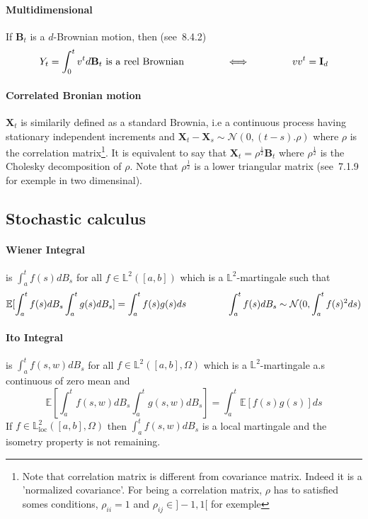 \documentclass[a4paper,10pt]{article}
\begin{document}
\paragraph{Multidimensional}
If $\textbf{B}_t$ is a $d$-Brownian motion, then (see~\cite{OKSENDAL}8.4.2)
\[
Y_t = \int_0^t v^t d\textbf{B}_t \text{ is a reel Brownian} 
\hspace{1.5cm} \Longleftrightarrow \hspace{1.5cm}
vv^t = \textbf{I}_d
\]
\paragraph{Correlated Bronian motion } $\textbf{X}_t$ is similarily defined as a standard Brownia, i.e a continuous process having stationary independent increments and $\textbf{X}_t - \textbf{X}_s \sim \mathcal{N}(0,(t-s).\rho)$ where $\rho$ is the correlation matrix\footnote{Note that correlation matrix is different from covariance matrix. Indeed it is a 'normalized covariance'. For being a correlation matrix, $\rho$ has to satisfied somes conditions, $\rho_{ii}=1$ and $\rho_{ij} \in ]-1,1[$ for exemple}. It is equivalent to say that $\textbf{X}_t = \rho^{\frac{1}{2}} \textbf{B}_t$ where $\rho^{\frac{1}{2}}$ is the Cholesky decomposition of $\rho$. Note that $\rho^{\frac{1}{2}}$ is a lower triangular matrix (see~\cite{MAREK}7.1.9 for exemple in two dimensinal).

\subsection{Stochastic calculus}
\paragraph{Wiener Integral} is $\int_a^t f(s)dB_s$ for all $f\in \mathbb{L}^2([a,b])$ which is a $\mathbb{L}^2$-martingale such that
\[
\mathbb{E}[\int_a^t f(s)dB_s \int_a^t g(s)dB_s] = \int_a^t f(s)g(s)ds
\hspace{1.5cm}
\int_a^t f(s)dB_s \sim \mathcal{N}(0, \int_a^t f(s)^2ds)
\]
\paragraph{Ito Integral} is $\int_a^t f(s,w)dB_s$ for all $f\in \mathbb{L}^2([a,b],\Omega)$ which is a $\mathbb{L}^2$-martingale a.s continuous of zero mean and
\[
\mathbb{E}[\int_a^t f(s,w)dB_s \int_a^t g(s,w)dB_s] = \int_a^t \mathbb{E}[f(s)g(s)]ds
\]
If $f\in \mathbb{L}_{\text{loc}}^2([a,b],\Omega)$ then $\int_a^t f(s,w)dB_s$ is a local martingale and the isometry property is not remaining.
\end{document}
